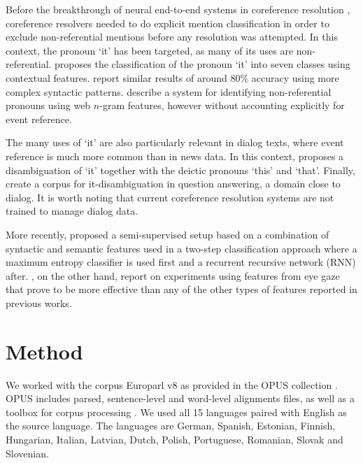 \documentclass[10pt, a4paper]{article}
\begin{document}
%
% 
Before the breakthrough of neural end-to-end systems in coreference resolution
\cite{Lee:2017}, coreference resolvers needed to do explicit mention
classification in order to exclude non-referential mentions before any
resolution was attempted. In this context, the pronoun `it' has been targeted,
as many of its uses are non-referential.  proposes the
classification of the pronoun `it' into seven classes using contextual features.
 report similar results of around 80\% accuracy using more
complex syntactic patterns.  describe a system for
identifying non-referential pronouns using web $n$-gram features, however
without accounting explicitly for event reference.

The many uses of `it' are also particularly relevant in dialog texts, where
event reference is much more common than in news data. In this context,
 proposes a disambiguation of `it' together with
the deictic pronouns `this' and `that'.  Finally,  create a corpus
for it-disambiguation in question answering, a domain close to dialog. It is
worth noting that current coreference resolution systems are not trained to
manage dialog data.

More recently,   proposed a semi-supervised setup
based on a combination of syntactic and semantic features used in a two-step
classification approach where a maximum entropy classifier is used first and a
recurrent recursive network (RNN) after. ,
on the other hand, report on experiments using features from eye gaze that prove
to be more effective than any of the other types of features reported in
previous works.




\section{Method}

We worked with the corpus Europarl \cite{Koehn2005} v8 as provided in the OPUS 
collection \cite{TIEDEMANN12.463}. OPUS includes parsed, sentence-level 
and word-level alignments files, as well as a toolbox for corpus processing 
\cite{aulamo-et-al-opus}. We used all 15 languages paired with English as the 
source language. The languages are German, Spanish, Estonian, Finnish, 
Hungarian, Italian, Latvian, Dutch, Polish, Portuguese, Romanian, Slovak and 
Slovenian.  
\end{document}
